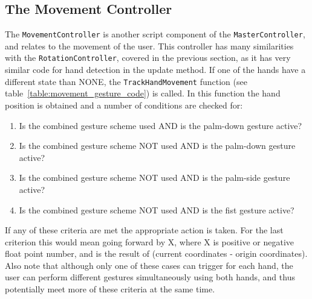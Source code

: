
\subsection{The Movement Controller}
The \texttt{MovementController} is another script component of the \texttt{MasterController}, and relates to the movement of the user. 
This controller has many similarities with the \texttt{RotationController}, covered in the previous section, as it has very similar
code for hand detection in the update method. If one of the hands have a different state than NONE, the \texttt{TrackHandMovement} function
(see table~\vref{table:movement_gesture_code}) is called. In this function the hand position is obtained and a number of conditions are checked for:

\begin{enumerate}
    \item Is the combined gesture scheme used AND is the palm-down gesture active?
    \item Is the combined gesture scheme NOT used AND is the palm-down gesture active?
    \item Is the combined gesture scheme NOT used AND is the palm-side gesture active?
    \item Is the combined gesture scheme NOT used AND is the fist gesture active?
\end{enumerate}

If any of these criteria are met the appropriate action is taken. 
For the last criterion this would mean going forward by X, where X is positive or negative float point number, 
and is the result of (current coordinates - origin coordinates). Also note that although only one of these cases can trigger for each hand, the user can 
perform different gestures simultaneously using both hands, and thus potentially meet more of these criteria at the same time.

